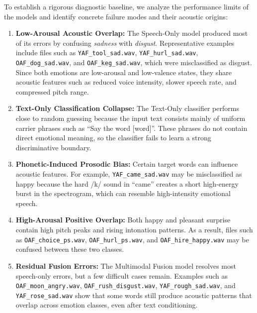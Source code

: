 \documentclass[11pt,journal,onecolumn]{IEEEtran}
\begin{document}
To establish a rigorous diagnostic baseline, we analyze the performance limits of the models and identify concrete failure modes and their acoustic origins:

\begin{enumerate}
    \item \textbf{Low-Arousal Acoustic Overlap:}
    The Speech-Only model produced most of its errors by confusing \textit{sadness} with \textit{disgust}. Representative examples include files such as \texttt{YAF\_tool\_sad.wav}, \texttt{YAF\_hurl\_sad.wav}, \texttt{OAF\_dog\_sad.wav}, and \texttt{OAF\_keg\_sad.wav}, which were misclassified as disgust. Since both emotions are low-arousal and low-valence states, they share acoustic features such as reduced voice intensity, slower speech rate, and compressed pitch range.

    \item \textbf{Text-Only Classification Collapse:}
    The Text-Only classifier performs close to random guessing because the input text consists mainly of uniform carrier phrases such as ``Say the word [word]''. These phrases do not contain direct emotional meaning, so the classifier fails to learn a strong discriminative boundary.

    \item \textbf{Phonetic-Induced Prosodic Bias:}
    Certain target words can influence acoustic features. For example, \texttt{YAF\_came\_sad.wav} may be misclassified as happy because the hard /k/ sound in ``came'' creates a short high-energy burst in the spectrogram, which can resemble high-intensity emotional speech.

    \item \textbf{High-Arousal Positive Overlap:}
    Both happy and pleasant surprise contain high pitch peaks and rising intonation patterns. As a result, files such as \texttt{OAF\_choice\_ps.wav}, \texttt{OAF\_hurl\_ps.wav}, and \texttt{OAF\_hire\_happy.wav} may be confused between these two classes.

    \item \textbf{Residual Fusion Errors:}
    The Multimodal Fusion model resolves most speech-only errors, but a few difficult cases remain. Examples such as \texttt{OAF\_moon\_angry.wav}, \texttt{OAF\_rush\_disgust.wav}, \texttt{YAF\_rough\_sad.wav}, and \texttt{YAF\_rose\_sad.wav} show that some words still produce acoustic patterns that overlap across emotion classes, even after text conditioning.
\end{enumerate}
\end{document}
